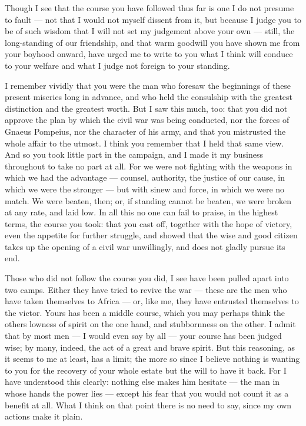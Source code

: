

 Though I see that the course you have followed thus far is one I do not presume to fault --- not that I would not myself dissent from it, but because I judge you to be of such wisdom that I will not set my judgement above your own --- still, the long-standing of our friendship, and that warm goodwill you have shown me from your boyhood onward, have urged me to write to you what I think will conduce to your welfare and what I judge not foreign to your standing.

 I remember vividly that you were the man who foresaw the beginnings of these present miseries long in advance, and who held the consulship with the greatest distinction and the greatest worth. But I saw this much, too: that you did not approve the plan by which the civil war was being conducted, nor the forces of Gnaeus Pompeius, nor the character of his army, and that you mistrusted the whole affair to the utmost. I think you remember that I held that same view. And so you took little part in the campaign, and I made it my business throughout to take no part at all. For we were not fighting with the weapons in which we had the advantage --- counsel, authority, the justice of our cause, in which we were the stronger --- but with sinew and force, in which we were no match. We were beaten, then; or, if standing cannot be beaten, we were broken at any rate, and laid low. In all this no one can fail to praise, in the highest terms, the course you took: that you cast off, together with the hope of victory, even the appetite for further struggle, and showed that the wise and good citizen takes up the opening of a civil war unwillingly, and does not gladly pursue its end.

 Those who did not follow the course you did, I see have been pulled apart into two camps. Either they have tried to revive the war --- these are the men who have taken themselves to Africa --- or, like me, they have entrusted themselves to the victor. Yours has been a middle course, which you may perhaps think the others lowness of spirit on the one hand, and stubbornness on the other. I admit that by most men --- I would even say by all --- your course has been judged wise; by many, indeed, the act of a great and brave spirit. But this reasoning, as it seems to me at least, has a limit; the more so since I believe nothing is wanting to you for the recovery of your whole estate but the will to have it back. For I have understood this clearly: nothing else makes him hesitate --- the man in whose hands the power lies --- except his fear that you would not count it as a benefit at all. What I think on that point there is no need to say, since my own actions make it plain.

